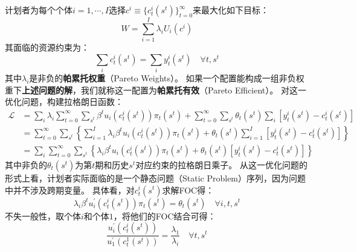 计划者为每个个体$i=1,\cdots,I$选择$c^i \equiv \{c_t^i\left(s^t\right)\}_{t=0}^{\infty}$来最大化如下目标：
\begin{equation}    \label{eq-pareto-maxU}
    W=\sum_{i=1}^I \lambda_i U_i\left(c^i\right)
\end{equation}
其面临的资源约束为：
\begin{equation}    \label{eq-pareto-rc}
    \sum_i c_t^i\left(s^t\right) = \sum_i y_t^i\left(s^t\right) \quad \forall t, s^t
\end{equation}
其中$\lambda_i$是非负的\textbf{帕累托权重}（Pareto Weights）。
如果一个配置能构成一组非负权重下\textbf{上述问题的解}，我们就称这一配置为\textbf{帕累托有效}（Pareto Efficient）。
对这一优化问题，构建拉格朗日函数：
\begin{equation*}
    \begin{aligned}
        \mathcal{L} &= \sum_i \lambda_i \sum_{t=0}^{\infty} \sum_{s^t} \beta^t u_i\left(c_t^i\left(s^t\right)\right) \pi_t\left(s^t\right)
                    + \sum_{t=0}^{\infty} \sum_{s^t} \theta_t\left(s^t\right) \sum_i\left[y_t^i\left(s^t\right)-c_t^i\left(s^t\right)\right] \\
                    &= \sum_{t=0}^{\infty} \sum_{s^t}
                    \left\{\sum_{i=1}^I \lambda_i \beta^t u_i\left(c_t^i\left(s^t\right)\right) \pi_t\left(s^t\right)
                        +\theta_t\left(s^t\right) \sum_{i=1}^I\left[y_t^i\left(s^t\right)-c_t^i\left(s^t\right)\right]\right\} \\
                    &= \sum_i \sum_{t=0}^{\infty} \sum_{s^t}
                    \left\{\lambda_i \beta^t u_i\left(c_t^i\left(s^t\right)\right) \pi_t\left(s^t\right)
                        +\theta_t\left(s^t\right)\left[y_t^i\left(s^t\right)-c_t^i\left(s^t\right)\right]\right\}
    \end{aligned}
\end{equation*}
其中非负的$\theta_t\left(s^t\right)$为第$t$期和历史$s^t$对应约束的拉格朗日乘子。
从这一优化问题的形式上看，计划者实际面临的是一个静态问题（Static Problem）序列，因为问题中并不涉及跨期变量。
具体看，对$c_t^i\left(s^t\right)$求解FOC得：
\begin{equation}    \label{eq-pareto-foc}
    \lambda_i \beta^t u_i^{\prime}\left(c_t^i\left(s^t\right)\right) \pi_t\left(s^t\right)=\theta_t\left(s^t\right) \quad \forall i, t, s^t
\end{equation}
不失一般性，取个体$i$和个体$1$，将他们的FOC结合可得：
\begin{equation}    \label{eq-pareto-r-foc}
    \frac{u_i^{\prime}\left(c_t^i\left(s^t\right)\right)}{u_1^{\prime}\left(c_t^1\left(s^t\right)\right)}=\frac{\lambda_1}{\lambda_i}
        \quad \forall t, s^t
\end{equation}
